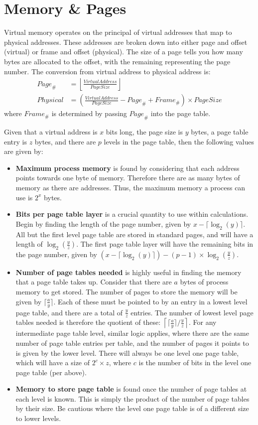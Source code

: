 \documentclass{article}
\begin{document}
\newpage
\section{Memory \& Pages}
Virtual memory operates on the principal of virtual addresses that map to physical addresses. These addresses are broken down into either page and offset (virtual) or frame and offset (physical). The size of a page tells you how many bytes are allocated to the offset, with the remaining representing the page number. The conversion from virtual address to physical address is:
\begin{align*}
    {Page}_\# &= \left\lfloor\frac{Virtual Address}{Page Size}\right\rfloor \\
    Physical &= \left(\frac{Virtual Address}{Page Size} - {Page}_\# + {Frame}_\#\right) \times Page Size
\end{align*}
where ${Frame}_\#$ is determined by passing ${Page}_\#$ into the page table.

Given that a virtual address is $x$ bits long, the page size is $y$ bytes, a page table entry is $z$ bytes, and there are $p$ levels in the page table, then the following values are given by:
\begin{itemize}
    \item \textbf{Maximum process memory} is found by considering that each address points towards one byte of memory. Therefore there are as many bytes of memory as there are addresses. Thus, the maximum memory a process can use is $2^x$ bytes.
    \item \textbf{Bits per page table layer} is a crucial quantity to use within calculations. Begin by finding the length of the page number, given by $x - \lceil\log_2{(y)}\rceil$. All but the first level page table are stored in standard pages, and will have a length of $\log_2{(\frac{y}{z})}$. The first page table layer will have the remaining bits in the page number, given by $(x - \lceil\log_2{(y)}\rceil) - (p-1)\times\log_2{(\frac{y}{z})}$.
    \item \textbf{Number of page tables needed} is highly useful in finding the memory that a page table takes up. Consider that there are $a$ bytes of process memory to get stored. The number of pages to store the memory will be given by $\lceil\frac{a}{y}\rceil$. Each of these must be pointed to by an entry in a lowest level page table, and there are a total of $\frac{y}{z}$ entries. The number of lowest level page tables needed is therefore the quotient of these: $\left\lceil\lceil\frac{a}{y}\rceil / \frac{y}{z}\right\rceil$. For any intermediate page table level, similar logic applies, where there are the same number of page table entries per table, and the number of pages it points to is given by the lower level. There will always be one level one page table, which will have a size of $2^c \times z$, where $c$ is the number of bits in the level one page table (per above).
    \item \textbf{Memory to store page table} is found once the number of page tables at each level is known. This is simply the product of the number of page tables by their size. Be cautious where the level one page table is of a different size to lower levels.
\end{itemize}
\end{document}
